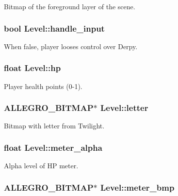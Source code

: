 \-Bitmap of the foreground layer of the scene. \hypertarget{structLevel_a06cf4f2da517284d2006540051d3e5c0}{
\subsubsection[{handle\-\_\-input}]{\setlength{\rightskip}{0pt plus 5cm}bool {\bf \-Level\-::handle\-\_\-input}}}\label{structLevel_a06cf4f2da517284d2006540051d3e5c0}
\-When false, player looses control over \-Derpy. \hypertarget{structLevel_a49df009e8113251cfcb48fe17df0b571}{
\subsubsection[{hp}]{\setlength{\rightskip}{0pt plus 5cm}float {\bf \-Level\-::hp}}}\label{structLevel_a49df009e8113251cfcb48fe17df0b571}
\-Player health points (0-\/1). \hypertarget{structLevel_af1b1699478b4633d76c01ea09e666df4}{
\subsubsection[{letter}]{\setlength{\rightskip}{0pt plus 5cm}\-A\-L\-L\-E\-G\-R\-O\-\_\-\-B\-I\-T\-M\-A\-P$\ast$ {\bf \-Level\-::letter}}}\label{structLevel_af1b1699478b4633d76c01ea09e666df4}
\-Bitmap with letter from \-Twilight. \hypertarget{structLevel_a246ce1ecf1523db218cf067df15e511f}{
\subsubsection[{meter\-\_\-alpha}]{\setlength{\rightskip}{0pt plus 5cm}float {\bf \-Level\-::meter\-\_\-alpha}}}\label{structLevel_a246ce1ecf1523db218cf067df15e511f}
\-Alpha level of \-H\-P meter. \hypertarget{structLevel_a4e78a54cbf3cdcc804f65acb03cef0b3}{
\subsubsection[{meter\-\_\-bmp}]{\setlength{\rightskip}{0pt plus 5cm}\-A\-L\-L\-E\-G\-R\-O\-\_\-\-B\-I\-T\-M\-A\-P$\ast$ {\bf \-Level\-::meter\-\_\-bmp}}}\label{structLevel_a4e78a54cbf3cdcc804f65acb03cef0b3}
